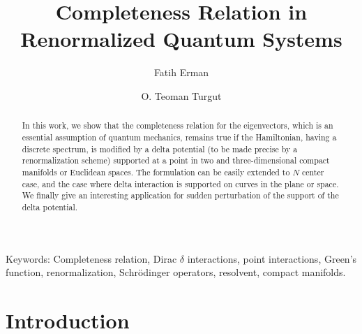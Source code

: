 \documentclass[amsmath,amssymb,14pt]{article}
\numberwithin{equation}{section}
\begin{document}
\title{Completeness Relation in Renormalized Quantum Systems}




\author[1]{Fatih Erman}
\author[2, 3]{O. Teoman Turgut}






\maketitle


\begin{abstract} In this work, we show that the completeness relation for the eigenvectors, which is an essential assumption of quantum mechanics, remains true if the Hamiltonian, having a discrete spectrum, is modified by a delta potential (to be made precise by a renormalization scheme) supported at a point in two and three-dimensional compact manifolds or Euclidean spaces. The formulation can be easily extended
to $N$ center case, and the case where delta interaction is supported on curves in the plane or space. We finally give an interesting application for sudden perturbation of the support of the delta potential. \end{abstract}



Keywords: Completeness relation, Dirac $\delta$ interactions, point interactions, Green's function, renormalization, Schr\"{o}dinger operators, resolvent, compact manifolds. 
\section{Introduction} \label{introduction}
\end{document}

